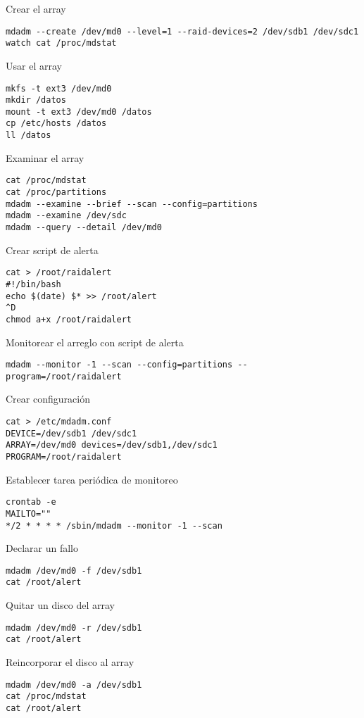 Crear el array
\begin{lstlisting}
mdadm --create /dev/md0 --level=1 --raid-devices=2 /dev/sdb1 /dev/sdc1
watch cat /proc/mdstat
\end{lstlisting}

Usar el array
\begin{lstlisting}
mkfs -t ext3 /dev/md0
mkdir /datos
mount -t ext3 /dev/md0 /datos
cp /etc/hosts /datos
ll /datos
\end{lstlisting}

Examinar el array
\begin{lstlisting}
cat /proc/mdstat
cat /proc/partitions
mdadm --examine --brief --scan --config=partitions
mdadm --examine /dev/sdc
mdadm --query --detail /dev/md0
\end{lstlisting}

Crear script de alerta
\begin{lstlisting}
cat > /root/raidalert
#!/bin/bash
echo $(date) $* >> /root/alert
^D
chmod a+x /root/raidalert
\end{lstlisting}

Monitorear el arreglo con script de alerta
\begin{lstlisting}
mdadm --monitor -1 --scan --config=partitions --program=/root/raidalert
\end{lstlisting}

Crear configuración
\begin{lstlisting}
cat > /etc/mdadm.conf
DEVICE=/dev/sdb1 /dev/sdc1
ARRAY=/dev/md0 devices=/dev/sdb1,/dev/sdc1
PROGRAM=/root/raidalert
\end{lstlisting}

Establecer tarea periódica de monitoreo
\begin{lstlisting}
crontab -e
MAILTO=""
*/2 * * * * /sbin/mdadm --monitor -1 --scan 
\end{lstlisting}

Declarar un fallo
\begin{lstlisting}
mdadm /dev/md0 -f /dev/sdb1
cat /root/alert
\end{lstlisting}

Quitar un disco del array
\begin{lstlisting}
mdadm /dev/md0 -r /dev/sdb1 
cat /root/alert
\end{lstlisting}

Reincorporar el disco al array
\begin{lstlisting}
mdadm /dev/md0 -a /dev/sdb1 
cat /proc/mdstat
cat /root/alert
\end{lstlisting}

